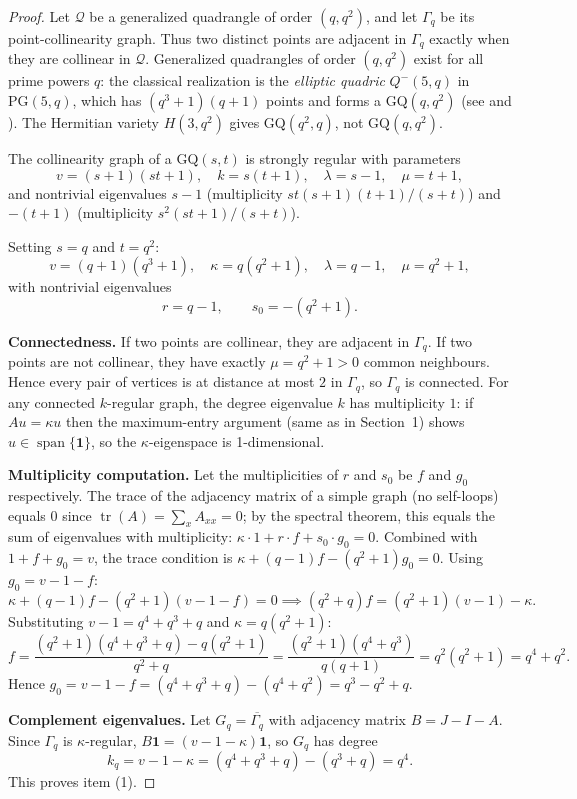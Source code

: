 \documentclass{article}
\theoremstyle{definition}
\begin{document}
\begin{proof}
Let $\mathcal{Q}$ be a generalized quadrangle of order $(q,q^2)$, and let $\Gamma_q$ be its point-collinearity graph. Thus two distinct points are adjacent in $\Gamma_q$ exactly when they are collinear in $\mathcal{Q}$. Generalized quadrangles of order $(q,q^2)$ exist for all prime powers $q$: the classical realization is the \emph{elliptic quadric} $Q^-(5,q)$ in $\mathrm{PG}(5,q)$, which has $(q^3+1)(q+1)$ points and forms a $\mathrm{GQ}(q,q^2)$ (see \cite{PT1984} and \cite{BvM2022}). The Hermitian variety $H(3,q^2)$ gives $\mathrm{GQ}(q^2,q)$, not $\mathrm{GQ}(q,q^2)$.

The collinearity graph of a $\mathrm{GQ}(s,t)$ is strongly regular with parameters \cite{PT1984}
\[
v=(s+1)(st+1),\quad k=s(t+1),\quad \lambda=s-1,\quad \mu=t+1,
\]
and nontrivial eigenvalues $s-1$ (multiplicity $st(s+1)(t+1)/(s+t)$) and $-(t+1)$ (multiplicity $s^2(st+1)/(s+t)$).

Setting $s=q$ and $t=q^2$:
\[
v=(q+1)(q^3+1),\quad \kappa=q(q^2+1),\quad \lambda=q-1,\quad \mu=q^2+1,
\]
with nontrivial eigenvalues
\[
r=q-1,\qquad s_0=-(q^2+1).
\]

\textbf{Connectedness.} If two points are collinear, they are adjacent in $\Gamma_q$. If two points are not collinear, they have exactly $\mu=q^2+1>0$ common neighbours. Hence every pair of vertices is at distance at most $2$ in $\Gamma_q$, so $\Gamma_q$ is connected. For any connected $k$-regular graph, the degree eigenvalue $k$ has multiplicity $1$: if $Au=\kappa u$ then the maximum-entry argument (same as in Section~1) shows $u\in\operatorname{span}\{\mathbf{1}\}$, so the $\kappa$-eigenspace is 1-dimensional.

\textbf{Multiplicity computation.} Let the multiplicities of $r$ and $s_0$ be $f$ and $g_0$ respectively. The trace of the adjacency matrix of a simple graph (no self-loops) equals $0$ since $\operatorname{tr}(A)=\sum_x A_{xx}=0$; by the spectral theorem, this equals the sum of eigenvalues with multiplicity: $\kappa\cdot 1 + r\cdot f + s_0\cdot g_0 = 0$. Combined with $1+f+g_0=v$, the trace condition is $\kappa+(q-1)f-(q^2+1)g_0=0$. Using $g_0=v-1-f$:
\[
\kappa+(q-1)f-(q^2+1)(v-1-f)=0 \implies (q^2+q)f=(q^2+1)(v-1)-\kappa.
\]
Substituting $v-1=q^4+q^3+q$ and $\kappa=q(q^2+1)$:
\[
f=\frac{(q^2+1)(q^4+q^3+q)-q(q^2+1)}{q^2+q}
=\frac{(q^2+1)(q^4+q^3)}{q(q+1)}
=q^2(q^2+1)=q^4+q^2.
\]
Hence $g_0=v-1-f=(q^4+q^3+q)-(q^4+q^2)=q^3-q^2+q$.

\textbf{Complement eigenvalues.} Let $G_q=\overline{\Gamma_q}$ with adjacency matrix $B=J-I-A$. Since $\Gamma_q$ is $\kappa$-regular, $B\mathbf{1}=(v-1-\kappa)\mathbf{1}$, so $G_q$ has degree
\[
k_q=v-1-\kappa=(q^4+q^3+q)-(q^3+q)=q^4.
\]
This proves item (1).


\end{proof}
\end{document}
